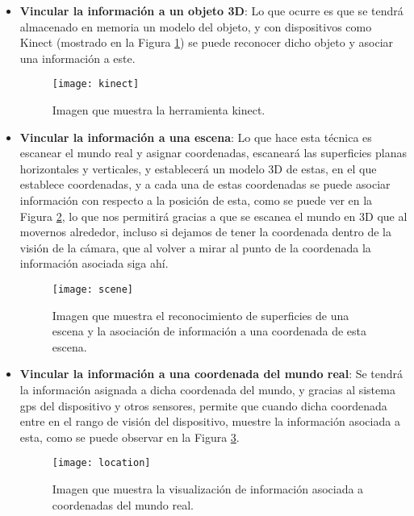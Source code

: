 \begin{itemize}
  \item \textbf{Vincular la información a un objeto 3D}: Lo que ocurre es que se tendrá almacenado en memoria un modelo del objeto, y con dispositivos como Kinect (mostrado en la Figura \ref{figura-kinect}) se puede reconocer dicho objeto y asociar una información a este.

  \begin{figure}[h]
    \centering
    \texttt{[image: kinect]}
    \caption{Imagen que muestra la herramienta kinect.\protect\footnotemark}
    \label{figura-kinect}
  \end{figure}


  \item \textbf{Vincular la información a una escena}:  Lo que hace esta técnica es escanear el mundo real y asignar coordenadas, escaneará las superficies planas horizontales y verticales, y establecerá un modelo 3D de estas, en el que establece coordenadas, y a cada una de estas coordenadas se puede asociar información con respecto a la posición de esta, como se puede ver en la Figura \ref{figura-scene}, lo que nos permitirá gracias a que se escanea el mundo en 3D que al movernos alrededor, incluso si dejamos de tener la coordenada dentro de la visión de la cámara, que al volver a mirar al punto de la coordenada la información asociada siga ahí.

  \begin{figure}[h]
    \centering
    \texttt{[image: scene]}
    \caption{Imagen que muestra el reconocimiento de superficies de una escena y la asociación de información a una coordenada de esta escena.\protect\footnotemark}
    \label{figura-scene}
  \end{figure}


  \item \textbf{Vincular la información a una coordenada del mundo real}: Se tendrá la información asignada a dicha coordenada del mundo, y gracias al sistema gps del dispositivo y otros sensores, permite que cuando dicha coordenada entre en el rango de visión del dispositivo, muestre la información asociada a esta, como se puede observar en la Figura \ref{figura-location}.

  \begin{figure}[h]
    \centering
    \texttt{[image: location]}
    \caption{Imagen que muestra la visualización de información asociada a coordenadas del mundo real.\protect\footnotemark}
    \label{figura-location}
  \end{figure}


\end{itemize}

